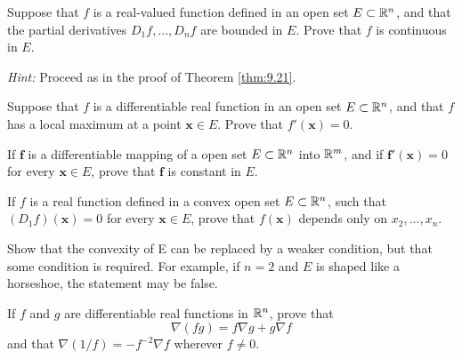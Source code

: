 \begin{myexercise}
    \label{ex:9.7}
    Suppose that $f$ is a real-valued function defined in an open set $E \subset {\protect\mathbb R}^n$, 
    and that the partial derivatives $D_1f, \dots , D_nf$ are bounded in $E$. 
    Prove that $f$ is continuous in $E$.

    \emph{Hint:} Proceed as in the proof of Theorem \ref{thm:9.21}.
\end{myexercise}


\begin{myexercise}
    \label{ex:9.8}
    Suppose that $f$ is a differentiable real function in an open set $E \subset {\protect\mathbb R}^n$, 
    and that $f$ has a local maximum at a point $\mathbf{x} \in E$. 
    Prove that $f'(\mathbf{x}) = 0$.
\end{myexercise}


\begin{myexercise}
    \label{ex:9.9}
    If $\mathbf{f}$ is a differentiable mapping of a  open set $E \subset {\protect\mathbb R}^n$ into ${\protect\mathbb R}^m$, 
    and if $\mathbf{f}'(\mathbf{x}) = 0$ for every $\mathbf{x} \in E$, 
    prove that $\mathbf{f}$ is constant in $E$.
\end{myexercise}


\begin{myexercise}
    \label{ex:9.10}
    If $f$ is a real function defined in a convex open set $E \subset {\protect\mathbb R}^n$, 
    such that $(D_1f)(\mathbf{x}) = 0$ for every $\mathbf{x} \in E$, 
    prove that $f(\mathbf{x})$ depends only on $x_2, ... , x_n$.

    Show that the convexity of E can be replaced by a weaker condition, but that some condition is required. 
    For example, if $n = 2$ and $E$ is shaped like a horseshoe, the statement may be false.
\end{myexercise}



\begin{myexercise}
    \label{ex:9.11}
    If $f$ and $g$ are differentiable real functions in ${\protect\mathbb R}^n$, 
    prove that
    \begin{equation*}
        \nabla (fg) = 
        f\nabla g + 
        g\nabla f 
    \end{equation*}
    and that $\nabla (1/f)=-f^{-2}\nabla f$ wherever $f \neq 0$.
\end{myexercise}


